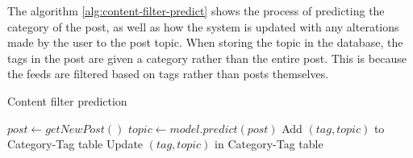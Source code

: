 The algorithm \ref{alg:content-filter-predict} shows the process of predicting the category of the post, as well as how the system is updated with any alterations made by the user to the post topic. When storing the topic in the database, the tags in the post are given a category rather than the entire post. This is because the feeds are filtered based on tags rather than posts themselves.

\begin{algorithm}
\caption{Content filter prediction}
\label{alg:content-filter-predict}
\begin{algorithmic}[1]
	\State $post\gets getNewPost()$
	\State $topic\gets model.predict(post)$
		\State Add $(tag,topic)$ to Category-Tag table
	\EndFor
			\State Update $(tag,topic)$ in Category-Tag table
		\EndFor
	\EndIf
\EndFunction
\end{algorithmic}
\end{algorithm}
